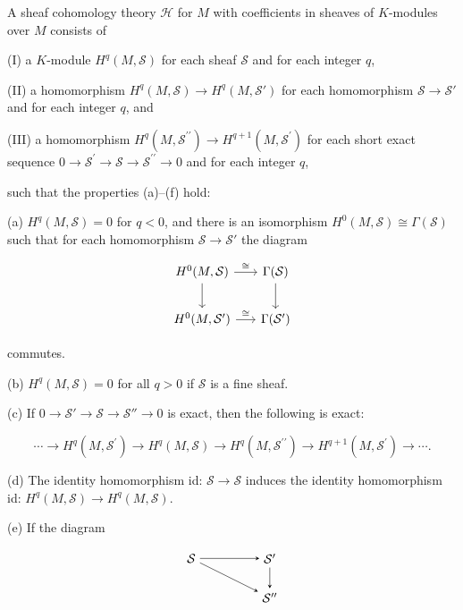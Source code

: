 \begin{definition}\label{thm:5.18}
A sheaf cohomology theory $\mathcal{H}$ for $M$ with coefficients in sheaves of $K$-modules over $M$ consists of 

(I) a $K$-module $H^q(M,\mathcal{S})$ for each sheaf $\mathcal{S}$ and for each integer $q$,

(II) a homomorphism  $ H^q(M,\mathcal{S}) \to H^q(M,\mathcal{S}') $ for each homomorphism  $ \mathcal{S} \to \mathcal{S}' $ and for each integer  $ q $, and

(III) a homomorphism $H^{q}(M,\mathcal{S}^{\prime \prime}) \to H^{q+1}(M,\mathcal{S}^{\prime})$ for each short exact sequence $0 \to \mathcal{S}^{\prime} \to \mathcal{S} \to \mathcal{S}^{\prime \prime} \to 0$ and for each integer $q$,

such that the properties (a)–(f) hold:

(a) $H^{q}(M,\mathcal{S}) = 0$ for $q < 0$, and there is an isomorphism $H^{0}(M,\mathcal{S}) \cong \Gamma(\mathcal{S})$ such that for each homomorphism $\mathcal{S} \to \mathcal{S}'$ the diagram

\[
\begin{tikzcd}[ampersand replacement=\&, column sep=1.6em,row sep=2em]
H^{0}(M,\mathcal{S}) \arrow[r ,"{\cong}"] \arrow[d] \& \Gamma(\mathcal{S}) \arrow[d] \\
H^{0}(M,\mathcal{S}^{\prime}) \arrow[r ,"{\cong}"] \& \Gamma(\mathcal{S}^{\prime})
\end{tikzcd}
\]

commutes.

(b)  $ H^{q}(M,\mathcal{S}) =0$ for all $q>0$ if  $ \mathcal{S} $ is a fine sheaf.

(c) If $0 \to \mathcal{S}' \to \mathcal{S} \to \mathcal{S}'' \to 0$ is exact, then the following is exact:

\[
\cdots\to H^{q}(M,\mathcal{S}^{\prime})\to H^{q}(M,\mathcal{S})\to H^{q}(M,\mathcal{S}^{\prime \prime})\to H^{q+1}(M,\mathcal{S}^{\prime})\to\cdots.
\]

(d) The identity homomorphism id: $\mathcal{S} \to \mathcal{S}$ induces the identity homomorphism id: $H^{q}(M,\mathcal{S}) \to H^{q}(M,\mathcal{S})$.

(e) If the diagram

\[
\begin{tikzpicture}[baseline={(current bounding box.center)},>=stealth]
\node (S) at (0,1.1) {$\mathcal{S}$};
\node (S1) at (2.2,1.1) {$\mathcal{S}'$};
\node (S2) at (2.2,0) {$\mathcal{S}''$};
\draw[->] (S) -- (S1);
\draw[->] (S1) -- (S2);
\draw[->] (S) -- (S2);
\end{tikzpicture}
\]


\end{definition}
